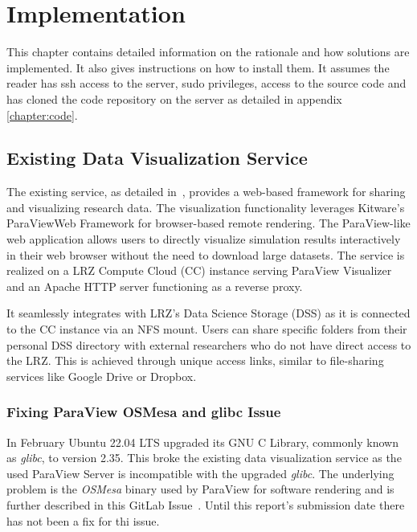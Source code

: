 \chapter{Implementation}\label{chapter:implementation}

This chapter contains detailed information on the rationale and how solutions
are implemented. It also gives instructions on how to install them. It assumes
the reader has ssh access to the server, sudo privileges, access to the source
code and has cloned the code repository on the server as detailed in appendix
\ref{chapter:code}.

\section{Existing Data Visualization Service}

The existing service, as detailed in~\cite{nowak2024pvw}, provides a web-based
framework for sharing and visualizing research data. The visualization
functionality leverages Kitware's ParaViewWeb Framework for browser-based remote
rendering. The ParaView-like web application allows users to directly visualize
simulation results interactively in their web browser without the need to
download large datasets. The service is realized on a LRZ Compute Cloud (CC)
instance serving ParaView Visualizer and an Apache HTTP server functioning as a
reverse proxy.

It seamlessly integrates with LRZ's Data Science Storage (DSS) as it is
connected to the CC instance via an NFS mount. Users can share specific folders
from their personal DSS directory with external researchers who do not have
direct access to the LRZ. This is achieved through unique access links, similar
to file-sharing services like Google Drive or Dropbox.

\subsection{Fixing ParaView OSMesa and glibc Issue}

In February Ubuntu 22.04 LTS upgraded its GNU C Library, commonly known as
\textit{glibc}, to version 2.35. This broke the existing data visualization
service as the used ParaView Server is incompatible with the upgraded
\textit{glibc}. The underlying problem is the \textit{OSMesa} binary used by
ParaView for software rendering and is further described in this GitLab
Issue~\cite{kitwareOsmesaBinary}. Until this report's submission date there has
not been a fix for thi issue.


